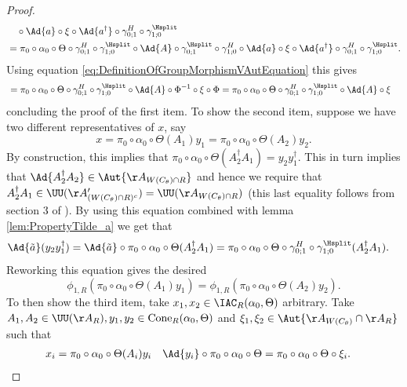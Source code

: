 \begin{proof}
\begin{align}
		\nonumber
		&\quad\circ\Ad{a}\circ\xi\circ\Ad{a^\dagger}\circ\gamma^H_{0;1}\circ\gamma^{\Hsplit}_{1;0}\\
		&=\pi_0\circ\alpha_0\circ\Theta\circ\gamma^H_{0;1}\circ\gamma^{\Hsplit}_{1;0}\circ\Ad{A}\circ\gamma^{\Hsplit}_{0;1}\circ\gamma^H_{1;0}\circ\Ad{a}\circ\xi\circ\Ad{a^\dagger}\circ\gamma^H_{0;1}\circ\gamma^{\Hsplit}_{1;0}.
	\end{align}
	Using equation \eqref{eq:DefinitionOfGroupMorphismVAutEquation} this gives
	\begin{align}
		&=\pi_0\circ\alpha_0\circ\Theta\circ\gamma^H_{0;1}\circ\gamma^{\Hsplit}_{1;0}\circ\Ad{A}\circ\Phi^{-1}\circ\xi\circ\Phi=\pi_0\circ\alpha_0\circ\Theta\circ\gamma^H_{0;1}\circ\gamma^{\Hsplit}_{1;0}\circ\Ad{A}\circ\xi
	\end{align}
	concluding the proof of the first item. To show the second item, suppose we have two different representatives of $x$, say
	\begin{equation}
		x=\pi_0\circ\alpha_0\circ\Theta(A_1)y_1=\pi_0\circ\alpha_0\circ\Theta(A_2)y_2.
	\end{equation}
	By construction, this implies that $\pi_0\circ\alpha_0\circ\Theta(A_2^\dagger A_1)=y_2 y_1^\dagger$. This in turn implies that $\Ad{A_2^\dagger A_2}\in\Aut{\AA_{W(C_\theta)\cap R}}$ and hence we require that $A_2^\dagger A_1\in\UU(\AA_{(W(C_\theta)\cap R)^c}')=\UU(\AA_{W(C_\theta)\cap R})$ (this last equality follows from section 3 of \cite{NaScWe_2013}). By using this equation combined with lemma \ref{lem:PropertyTilde_a} we get that
	\begin{align}
		\Ad{\tilde{a}}(y_2y_1^\dagger)&=\Ad{\tilde{a}}\circ\pi_0\circ\alpha_0\circ\Theta(A_2^\dagger A_1)=\pi_0\circ\alpha_0\circ\Theta\circ\gamma^H_{0;1}\circ\gamma^{\Hsplit}_{1;0}(A_2^\dagger A_1).
	\end{align}
	Reworking this equation gives the desired
	\begin{equation}
		\phi_{1,R}(\pi_0\circ\alpha_0\circ\Theta(A_1)y_1)=\phi_{1,R}(\pi_0\circ\alpha_0\circ\Theta(A_2)y_2).
	\end{equation}
	To then show the third item, take $x_1,x_2\in \IAC_R(\alpha_0,\Theta)$ arbitrary. Take $A_1,A_2\in\UU(\AA_R),y_1,y_2\in \textrm{Cone}_R(\alpha_0,\Theta)$ and $\xi_1,\xi_2\in\Aut{\AA_{W(C_\theta)}\cap\AA_R}$ such that
	\begin{align}
		x_i&=\pi_0\circ\alpha_0\circ\Theta(A_i)y_i&\Ad{y_i}\circ\pi_0\circ\alpha_0\circ\Theta&=\pi_0\circ\alpha_0\circ\Theta\circ\xi_i.
	\end{align}

\end{proof}
